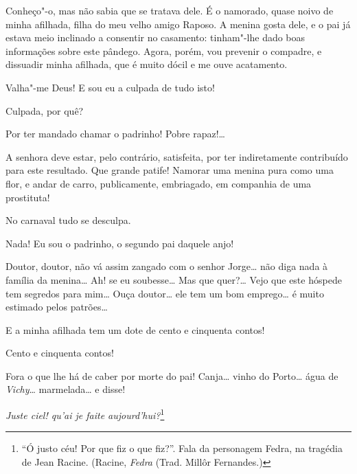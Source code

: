  Conheço"-o, mas não sabia que se tratava dele. É o namorado,
quase noivo de minha afilhada, filha do meu velho amigo Raposo. A
menina gosta dele, e o pai já estava meio inclinado a consentir no
casamento: tinham"-lhe dado boas informações sobre este pândego. Agora,
porém, vou prevenir o compadre, e dissuadir minha afilhada, que é muito
dócil e me ouve acatamento.

 Valha"-me Deus! E sou eu a culpada de tudo isto!

 Culpada, por quê?

 Por ter mandado chamar o padrinho! Pobre rapaz!\ldots{}

 A senhora deve estar, pelo contrário, satisfeita, por ter
indiretamente contribuído para este resultado.  Que grande patife! Namorar uma menina pura como uma
flor, e andar de carro, publicamente, embriagado, em companhia de uma
prostituta!

 No carnaval tudo se desculpa.

 Nada! Eu sou o padrinho, o segundo pai daquele anjo!

  Doutor, doutor, não vá
assim zangado com o senhor Jorge\ldots{} não diga nada à família da
menina\ldots{} Ah! se eu soubesse\ldots{} Mas que quer?\ldots{} Vejo que este hóspede
tem segredos para mim\ldots{}  Ouça
doutor\ldots{} ele tem um bom emprego\ldots{} é muito estimado pelos patrões\ldots{}

 E a minha afilhada tem um dote de cento e cinquenta contos!

  Cento e
cinquenta contos!

  Fora o que lhe há de caber por morte do
pai!  Canja\ldots{} vinho
do Porto\ldots{} água de \textit{Vichy}\ldots{} marmelada\ldots{} e disse!



  \textit{Juste ciel! qu’ai je faite aujourd’hui?}\footnote{
“Ó justo céu! Por que fiz o que fiz?”. Fala da personagem Fedra, na tragédia de
Jean Racine. (Racine, \textit{Fedra} (Trad. Millôr Fernandes.)}

